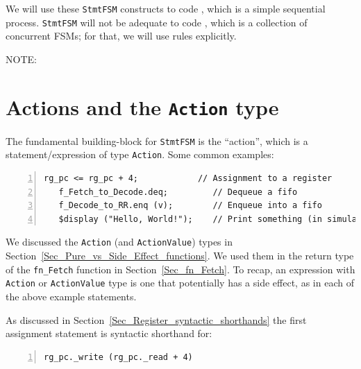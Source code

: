We will use these \verb|StmtFSM| constructs to code {\DRUM}, which is a
simple sequential process.  \verb|StmtFSM| will not be adequate to
code {\FIFE}, which is a collection of concurrent FSMs; for that, we will
use rules explicitly.

\vspace{2ex}

NOTE: 


\section{Actions and the {\tt Action} type}


The fundamental building-block for \verb|StmtFSM| is the ``action'',
which is a statement/expression of type \verb|Action|.  Some common
examples:

{\footnotesize
\begin{Verbatim}[frame=single, numbers=left]
   rg_pc <= rg_pc + 4;            // Assignment to a register
   f_Fetch_to_Decode.deq;         // Dequeue a fifo
   f_Decode_to_RR.enq (v);        // Enqueue into a fifo
   $display ("Hello, World!");    // Print something (in simulation only)
\end{Verbatim}
}

We discussed the \verb|Action| (and \verb|ActionValue|) types in
Section~\ref{Sec_Pure_vs_Side_Effect_functions}.  We used them in the
return type of the \verb|fn_Fetch| function in
Section~\ref{Sec_fn_Fetch}.  To recap, an expression with
\verb|Action| or \verb|ActionValue| type is one that potentially has a
side effect, as in each of the above example statements.

As discussed in Section~\ref{Sec_Register_syntactic_shorthands} the
first assignment statement is syntactic shorthand for:

{\footnotesize
\begin{Verbatim}[frame=single, numbers=left]
   rg_pc._write (rg_pc._read + 4)
\end{Verbatim}
}

